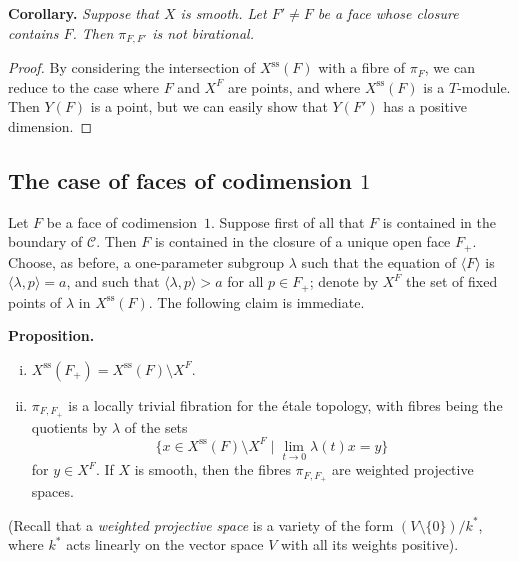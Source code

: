 \documentclass{article}
\newenvironment{itenv}[1]
  {\phantomsection\par\medskip\noindent\textbf{#1.}\itshape}
  {\par\medskip}
\renewcommand{\ss}{\mathrm{ss}}
\begin{document}
\begin{itenv}{Corollary}
  Suppose that $X$ is smooth.
  Let $F'\neq F$ be a face whose closure contains $F$.
  Then $\pi_{F,F'}$ is not birational.
\end{itenv}

\begin{proof}
  By considering the intersection of $X^\ss(F)$ with a fibre of $\pi_F$, we can reduce to the case where $F$ and $X^F$ are points, and where $X^\ss(F)$ is a $T$-module.
  Then $Y(F)$ is a point, but we can easily show that $Y(F')$ has a positive dimension.
\end{proof}


\subsection{The case of faces of codimension \texorpdfstring{$1$}{1}}
\label{1.5}

Let $F$ be a face of codimension~$1$.
Suppose first of all that $F$ is contained in the boundary of $\mathcal{C}$.
Then $F$ is contained in the closure of a unique open face $F_+$.
Choose, as before, a one-parameter subgroup $\lambda$ such that the equation of $\langle F\rangle$ is $\langle\lambda,p\rangle=a$, and such that $\langle\lambda,p\rangle>a$ for all $p\in F_+$;
denote by $X^F$ the set of fixed points of $\lambda$ in $X^\ss(F)$.
The following claim is immediate.

\begin{itenv}{Proposition}
  \begin{enumerate}[(i)]
    \item $X^\ss(F_+)=X^\ss(F)\setminus X^F$.
    \item $\pi_{F,F_+}$ is a locally trivial fibration for the \'{e}tale topology, with fibres being the quotients by $\lambda$ of the sets
      \[
        \big\{ x\in X^\ss(F)\setminus X^F \mid \lim_{t\to0}\lambda(t)x=y \big\}
      \]
      for $y\in X^F$.
      If $X$ is smooth, then the fibres $\pi_{F,F_+}$ are weighted projective spaces.
  \end{enumerate}
\end{itenv}

(Recall that a \emph{weighted projective space} is a variety of the form $(V\setminus\{0\})/k^*$, where $k^*$ acts linearly on the vector space $V$ with all its weights positive).
\end{document}
